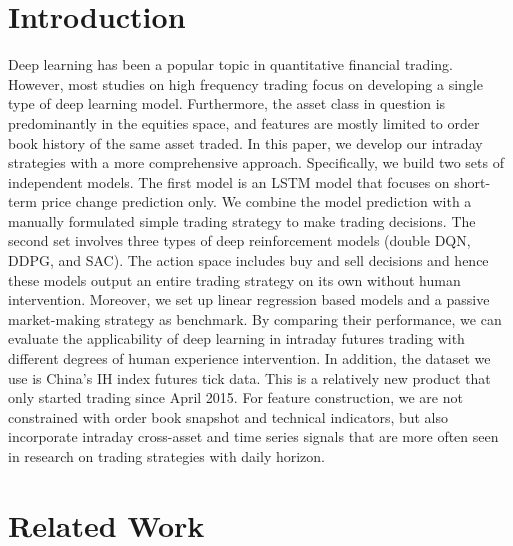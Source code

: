 \documentclass{article}
\begin{document}
\section{Introduction}
\label{intro}

Deep learning has been a popular topic in quantitative financial trading. However, most studies on high frequency trading focus on developing a single type of deep learning model. Furthermore, the asset class in question is predominantly in the equities space, and features are mostly limited to order book history of the same asset traded. In this paper, we develop our intraday strategies with a more comprehensive approach. Specifically, we build two sets of independent models. The first model is an LSTM model that focuses on short-term price change prediction only. We combine the model prediction with a manually formulated simple trading strategy to make trading decisions. The second set involves three types of deep reinforcement models (double DQN, DDPG, and SAC). The action space includes buy and sell decisions and hence these models output an entire trading strategy on its own without human intervention. Moreover, we set up linear regression based models and a passive market-making strategy as benchmark. By comparing their performance, we can evaluate the applicability of deep learning in intraday futures trading with different degrees of human experience intervention. In addition, the dataset we use is China’s IH index futures tick data. This is a relatively new product that only started trading since April 2015. For feature construction, we are not constrained with order book snapshot and technical indicators, but also incorporate intraday cross-asset and time series signals that are more often seen in research on trading strategies with daily horizon. 

\section{Related Work}
\end{document}
